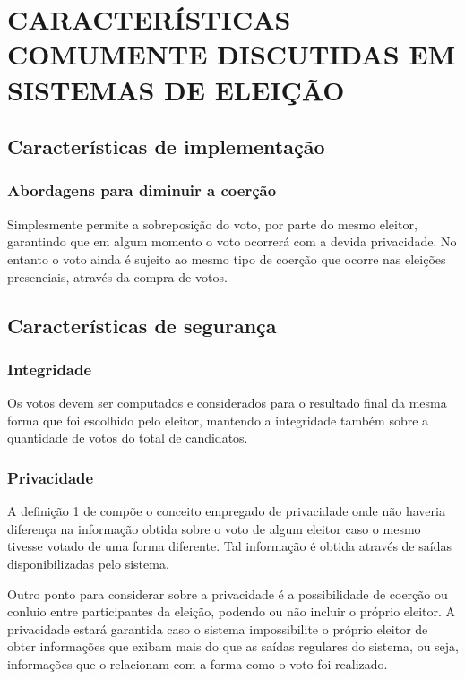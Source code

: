 \chapter{\textbf{CARACTERÍSTICAS COMUMENTE DISCUTIDAS EM SISTEMAS DE ELEIÇÃO}}

\section{Características de implementação}
    \subsection{Abordagens para diminuir a coerção}
        \cite{juels2010coercion} Simplesmente permite a sobreposição do voto, por parte do mesmo eleitor, garantindo que em algum momento o voto ocorrerá com a devida privacidade. No entanto o voto ainda é sujeito ao mesmo tipo de coerção que ocorre nas eleições presenciais, através da compra de votos. 

\section{Características de segurança}
    \subsection{Integridade} 
        Os votos devem ser computados e considerados para o resultado final da mesma forma que foi escolhido pelo eleitor, mantendo a integridade também sobre a quantidade de votos do total de candidatos.
        \cite{infoModelWote}
    
    \subsection{Privacidade} 
        A definição 1 de \cite{coney2005PrivacyMeasurement} compõe o conceito empregado de privacidade onde não haveria diferença na informação obtida sobre o voto de algum eleitor caso o mesmo tivesse votado de uma forma diferente. Tal informação é obtida através de saídas disponibilizadas pelo sistema.
        
        Outro ponto para considerar sobre a privacidade é a possibilidade de coerção ou conluio entre participantes da eleição, podendo ou não incluir o próprio eleitor. A privacidade estará garantida caso o sistema impossibilite o próprio eleitor de obter informações que exibam mais do que as saídas regulares do sistema, ou seja, informações que o relacionam com a forma como o voto foi realizado.
        

